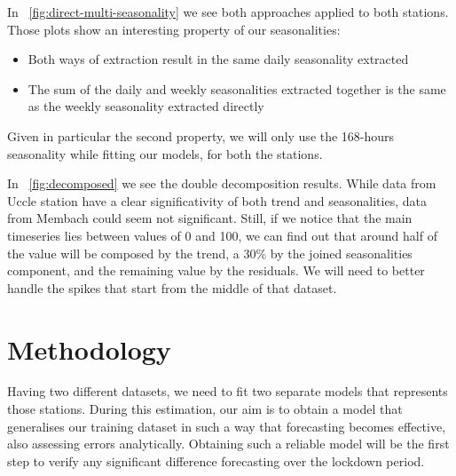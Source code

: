\documentclass[12pt]{article}
\begin{document}
In \figurename~\ref{fig:direct-multi-seasonality} we see both approaches applied to both stations. Those plots show an interesting property of our seasonalities:
\begin{itemize}[topsep=0.5em,itemsep=0em,partopsep=0.5em]
	\item Both ways of extraction result in the same daily seasonality extracted
	\item The sum of the daily and weekly seasonalities extracted together is the same as the weekly seasonality extracted directly
\end{itemize}
Given in particular the second property, we will only use the 168-hours seasonality while fitting our models, for both the stations.

In \figurename~\ref{fig:decomposed} we see the double decomposition results. While data from Uccle station have a clear significativity of both trend and seasonalities, data from Membach could seem not significant. Still, if we notice that the main timeseries lies between values of 0 and 100, we can find out that around half of the value will be composed by the trend, a 30\% by the joined seasonalities component, and the remaining value by the residuals. We will need to better handle the spikes that start from the middle of that dataset.


\section{Methodology}
Having two different datasets, we need to fit two separate models that represents those stations. During this estimation, our aim is to obtain a model that generalises our training dataset in such a way that forecasting becomes effective, also assessing errors analytically.
Obtaining such a reliable model will be the first step to verify any significant difference forecasting over the lockdown period.
\end{document}
